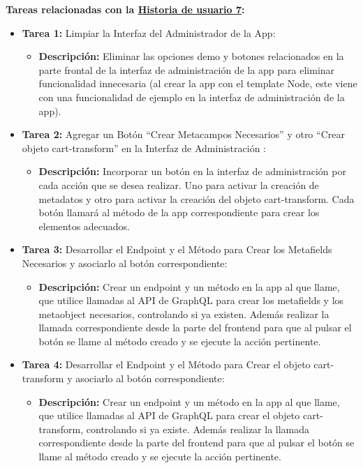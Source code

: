 \documentclass[12pt]{article}
\begin{document}
\textbf{Tareas relacionadas con la \hyperref[sec:historia7]{Historia de usuario 7}:}
\begin{itemize}
    \item \textbf{Tarea 1:} Limpiar la Interfaz del Administrador de la App:
          \begin{itemize}[label=--]
              \item \textbf{Descripción:} Eliminar las opciones demo y botones relacionados en la parte frontal de la interfaz de administración de la app para eliminar funcionalidad innecesaria (al crear la app con el template Node, este viene con una funcionalidad de ejemplo en la interfaz de administración de la app).
          \end{itemize}
    \item \textbf{Tarea 2:} Agregar un Botón ``Crear Metacampos Necesarios'' y otro ``Crear objeto cart-transform'' en la Interfaz de Administración :
          \begin{itemize}[label=--]
              \item \textbf{Descripción:} Incorporar un botón en la interfaz de administración por cada acción que se desea realizar. Uno para activar la creación de metadatos y otro para activar la creación del objeto cart-transform. Cada botón llamará al método de la app correspondiente para crear los elementos adecuados.
          \end{itemize}
    \item \textbf{Tarea 3:} Desarrollar el Endpoint y el Método para Crear los Metafields Necesarios y asociarlo al botón correspondiente:
          \begin{itemize}[label=--]
              \item \textbf{Descripción:} Crear un endpoint y un método en la app al que llame, que utilice llamadas al API de GraphQL para crear los metafields y los metaobject necesarios, controlando si ya existen. Además realizar la llamada correspondiente desde la parte del frontend para que al pulsar el botón se llame al método creado y se ejecute la acción pertinente.
          \end{itemize}
    \item \textbf{Tarea 4:} Desarrollar el Endpoint y el Método para Crear el objeto cart-transform y asociarlo al botón correspondiente:
          \begin{itemize}[label=--]
              \item \textbf{Descripción:} Crear un endpoint y un método en la app al que llame, que utilice llamadas al API de GraphQL para crear el objeto cart-transform, controlando si ya existe. Además realizar la llamada correspondiente desde la parte del frontend para que al pulsar el botón se llame al método creado y se ejecute la acción pertinente.

\end{itemize}
\end{itemize}
\end{document}
